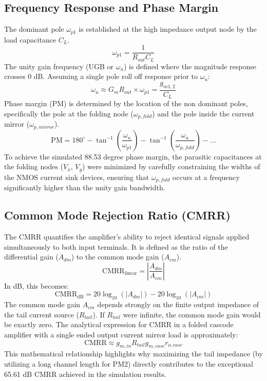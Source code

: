 \documentclass[conference]{IEEEtran}
\begin{document}
\subsection{Frequency Response and Phase Margin}
The dominant pole $\omega_{p1}$ is established at the high impedance output node by the load capacitance $C_L$.
\begin{equation}
    \omega_{p1} = \frac{1}{R_{out} C_L}
\end{equation}
The unity gain frequency (UGB or $\omega_u$) is defined where the magnitude response crosses 0 dB. Assuming a single pole roll off response prior to $\omega_u$:
\begin{equation}
    \omega_u \approx G_m R_{out} \times \omega_{p1} = \frac{g_{m1,2}}{C_L}
\end{equation}
Phase margin (PM) is determined by the location of the non dominant poles, specifically the pole at the folding node ($\omega_{p,fold}$) and the pole inside the current mirror ($\omega_{p,mirror}$). 
\begin{equation}
    \text{PM} = 180^\circ - \tan^{-1}\left(\frac{\omega_u}{\omega_{p1}}\right) - \tan^{-1}\left(\frac{\omega_u}{\omega_{p,fold}}\right) - \dots
\end{equation}
To achieve the simulated 88.53 degree phase margin, the parasitic capacitances at the folding nodes ($V_x$, $V_y$) were minimized by carefully constraining the widths of the NMOS current sink devices, ensuring that $\omega_{p,fold}$ occurs at a frequency significantly higher than the unity gain bandwidth.

\subsection{Common Mode Rejection Ratio (CMRR)}
The CMRR quantifies the amplifier's ability to reject identical signals applied simultaneously to both input terminals. It is defined as the ratio of the differential gain ($A_{dm}$) to the common mode gain ($A_{cm}$).
\begin{equation}
    \text{CMRR}_{\text{linear}} = \left| \frac{A_{dm}}{A_{cm}} \right|
\end{equation}
In dB, this becomes:
\begin{equation}
    \text{CMRR}_{\text{dB}} = 20 \log_{10}(|A_{dm}|) - 20 \log_{10}(|A_{cm}|)
\end{equation}
The common mode gain $A_{cm}$ depends strongly on the finite output impedance of the tail current source ($R_{tail}$). If $R_{tail}$ were infinite, the common mode gain would be exactly zero. The analytical expression for CMRR in a folded cascode amplifier with a single ended output current mirror load is approximately:
\begin{equation}
    \text{CMRR} \approx g_{m,in} R_{tail} g_{m,casc} r_{o,casc}
\end{equation}
This mathematical relationship highlights why maximizing the tail impedance (by utilizing a long channel length for PM2) directly contributes to the exceptional 65.61 dB CMRR achieved in the simulation results.
\end{document}
